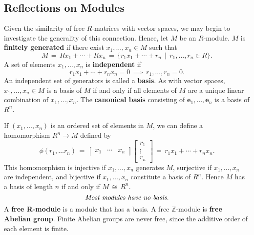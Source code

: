 \documentclass[11pt]{article}
\renewcommand{\vec}[1]{\mathbf{#1}}
\begin{document}

\subsection{Reflections on Modules}

Given the similarity of free $R$-matrices with vector spaces, we may begin to investigate the generality of this connection. Hence, let $M$ be an $R$-module. $M$ is \textbf{finitely generated} if there exist $x_{1}, \ldots, x_{n} \in M$ such that
\[
  M \, = \, Rx_{1} + \cdots + Rx_{n} \, = \, \{ r_{1}x_{1} + \cdots + r_{n} \, \mid \, r_{1}, \ldots, r_{n} \in R \}.
\]
A set of elements $x_{1}, \ldots, x_{n}$ is \textbf{independent} if
\[
  r_{1}x_{1} + \cdots + r_{n}x_{n} = 0 \, \implies \, r_{1}, \ldots, r_{n} = 0.
\]
An independent set of generators is called a \textbf{basis}. As with vector spaces, $x_{1}, \ldots, x_{n} \in M$ is a basis of $M$ if and only if all elements of $M$ are a unique linear combination of $x_{1}, \ldots, x_{n}$. The \textbf{canonical basis} consisting of $\vec{e}_{1}, \ldots, \vec{e}_{n}$ is a basis of $R^{n}$.

\newpage

If $(x_{1}, \ldots, x_{n})$ is an ordered set of elements in $M$, we can define a homomorphism $R^{n} \to M$ defined by
\[
  \phi(r_{1}, \ldots r_{n}) \, = \, \begin{bmatrix} x_{1} & \cdots & x_{n} \end{bmatrix} \begin{bmatrix} r_{1} \\ \vdots \\ r_{n} \end{bmatrix} \, = \, r_{1}x_{1} + \cdots + r_{n}x_{n}.
\]
This homomorphism is injective if $x_{1}, \ldots, x_{n}$ generates $M$, surjective if $x_{1}, \ldots, x_{n}$ are independent, and bijective if $x_{1}, \ldots, x_{n}$ constitute a basis of $R^{n}$. Hence $M$ has a basis of length $n$ if and only if $M \, \cong \, R^{n}$. 
\[
  \text{\textit{Most modules have no basis.}}
\]
A \textbf{free R-module} is a module that has a basis. A free $\mathbb{Z}$-module is \textbf{free Abelian group}. Finite Abelian groups are never free, since the additive order of each element is finite.



\end{document}
